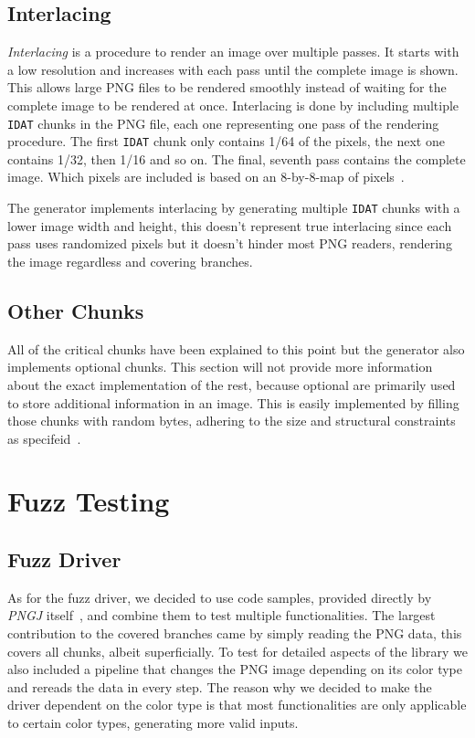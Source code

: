 \documentclass[runningheads]{llncs}
\begin{document}
\subsection{Interlacing}
\label{interlacing}
\textit{Interlacing} is a procedure to render an image over multiple passes. It starts with a low resolution and increases with each pass until the complete image is shown.
This allows large PNG files to be rendered smoothly instead of waiting for the complete image to be rendered at once.
Interlacing is done by including multiple \texttt{IDAT} chunks in the PNG file, each one representing one pass of the rendering procedure.
The first \texttt{IDAT} chunk only contains 1/64 of the pixels, the next one contains 1/32, then 1/16 and so on. The final, seventh pass contains the complete image.
Which pixels are included is based on an 8-by-8-map of pixels~\cite{libpng_data_representation}.

The generator implements interlacing by generating multiple \texttt{IDAT} chunks with a lower image width and height, this doesn't represent true interlacing since each pass uses randomized pixels but it doesn't hinder most PNG readers, rendering the image regardless and covering branches.
\subsection{Other Chunks}
All of the critical chunks have been explained to this point but the generator also implements optional chunks. 
This section will not provide more information about the exact implementation of the rest, because optional are primarily used to store additional information in an image.
This is easily implemented by filling those chunks with random bytes, adhering to the size and structural constraints as specifeid~\cite{libpng_chunks}.
\section{Fuzz Testing}
\subsection{Fuzz Driver}
As for the fuzz driver, we decided to use code samples, provided directly by \textit{PNGJ} itself~\cite{PNGJ_samples}, and combine them to test multiple functionalities.
The largest contribution to the covered branches came by simply reading the PNG data, this covers all chunks, albeit superficially.
To test for detailed aspects of the library we also included a pipeline that changes the PNG image depending on its color type and rereads the data in every step.
The reason why we decided to make the driver dependent on the color type is that most functionalities are only applicable to certain color types, generating more valid inputs.
\end{document}
